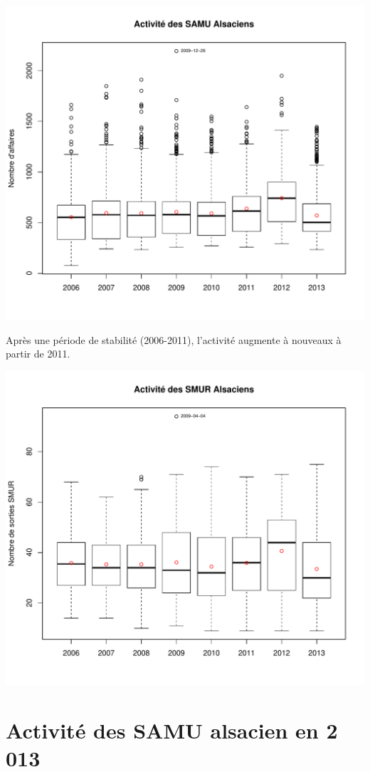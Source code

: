 \documentclass[12pt,english,french,twoside]{book}\usepackage[]{graphicx}\usepackage[]{color}
\makeatletter
\def\maxwidth{ %
  \ifdim\Gin@nat@width>\linewidth
    \linewidth
  \else
    \Gin@nat@width
  \fi
}
\makeatother
\begin{document}
\includegraphics[width=\maxwidth]{figure/samu_global-1} 


Après une période de stabilité (2006-2011), l'activité augmente à nouveaux à partir de 2011.


\includegraphics[width=\maxwidth]{figure/smur-1} 


\section*{Activité des SAMU alsacien en 2 013}
\end{document}
